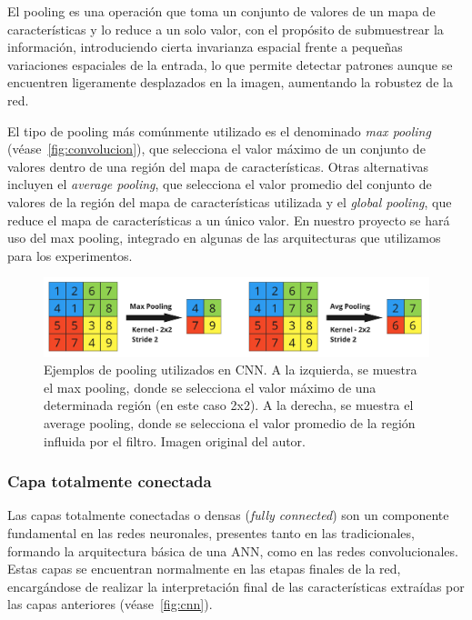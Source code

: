 El pooling es una operación que toma un conjunto de valores de un mapa de características y lo reduce a un solo valor, con el propósito de submuestrear la información, introduciendo cierta invarianza espacial frente a pequeñas variaciones espaciales de la entrada, lo que permite detectar patrones aunque se encuentren ligeramente desplazados en la imagen, aumentando la robustez de la red.\newline

El tipo de pooling más comúnmente utilizado es el denominado \emph{max pooling} (véase~\autoref{fig:convolucion}), que selecciona el valor máximo de un conjunto de valores dentro de una región del mapa de características. Otras alternativas incluyen el \emph{average pooling}, que selecciona el valor promedio del conjunto de valores de la región del mapa de características utilizada y el \emph{global pooling}, que reduce el mapa de características a un único valor. En nuestro proyecto se hará uso del max pooling, integrado en algunas de las arquitecturas que utilizamos para los experimentos.\newline

\begin{figure}[h]
    \centering
    \includegraphics[width=0.8\linewidth]{img/pooling.png}
    \caption[Ejemplos de pooling utilizados en CNN.]{Ejemplos de pooling utilizados en CNN. A la izquierda, se muestra el max pooling, donde se selecciona el valor máximo de una determinada región (en este caso 2x2). A la derecha, se muestra el average pooling, donde se selecciona el valor promedio de la región influida por el filtro. Imagen original del autor.}\label{fig:pooling}
\end{figure}

\subsubsection{Capa totalmente conectada}

Las capas totalmente conectadas o densas (\emph{fully connected}) son un componente fundamental en las redes neuronales, presentes tanto en las tradicionales, formando la arquitectura básica de una ANN, como en las redes convolucionales. Estas capas se encuentran normalmente en las etapas finales de la red, encargándose de realizar la interpretación final de las características extraídas por las capas anteriores (véase~\autoref{fig:cnn}).\newline

